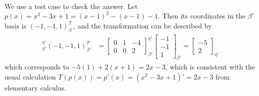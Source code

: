 \begin{solution}
\begin{align*}
\end{align*}
We use a test case to check the answer. Let $p(x) = x^2 - 3x + 1 = (x-1)^2 - (x-1) - 1$. Then its coordinates in the $\mathcal{\beta}'$ basis is $(-1,-1,1)^T_{\beta'}$, and the transformation can be described by 
\begin{align*}
[T]_{\beta'}^{\eta'} (-1,-1,1)^T_{\beta'} &= 
\begin{bmatrix}
0 & 1 & -4 \\
0 & 0 & 2
\end{bmatrix}_{\beta'}^{\eta'}
\begin{bmatrix}
-1 \\
-1 \\
1
\end{bmatrix}_{\beta'}
=
\begin{bmatrix}
-5 \\
2
\end{bmatrix}_{\eta'}
\end{align*}
which corresponds to $-5(1) + 2(x+1) = 2x-3$, which is consistent with the usual calculation $T(p(x)) = p'(x) = (x^2-3x+1)' = 2x-3$ from elementary calculus.
\end{solution}

